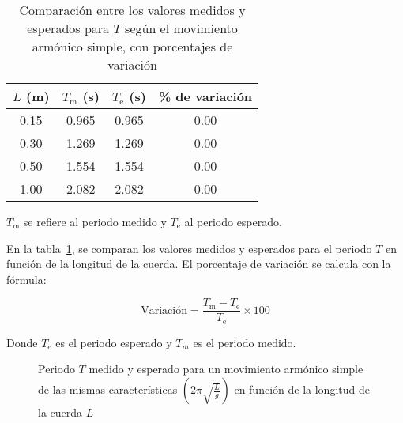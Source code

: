 \documentclass[twocolumn]{article}
\numberwithin{table}{section}
\begin{document}
\begin{table}
  \centering
  \begin{tabular}{cccc}
    \toprule
    $L$ (m) & $T_{\text{m}}$ (s) &
    $T_{\text{e}}$ (s) & \% de variación \\
    \midrule
    0.15 & 0.965 & 0.965 & 0.00 \\
    0.30 & 1.269 & 1.269 & 0.00 \\
    0.50 & 1.554 & 1.554 & 0.00 \\
    1.00 & 2.082 & 2.082 & 0.00 \\
    \bottomrule
  \end{tabular}

  \caption{Comparación entre los valores medidos y esperados para $T$
    según el movimiento armónico simple, con porcentajes de
  variación}\label{tab:comparación_longitud}

  \vspace{0.5em}
  \begin{minipage}{\columnwidth}
    \footnotesize
    $T_{\text{m}}$ se refiere al periodo medido y $T_{\text{e}}$ al
    periodo esperado.
  \end{minipage}
\end{table}

En la tabla~\ref{tab:comparación_longitud}, se comparan los valores medidos
y esperados para el periodo $T$ en función de la longitud de la
cuerda. El porcentaje de variación se calcula con la fórmula:

\begin{equation}
  \text{Variación} = \frac{T_{\text{m}} - T_{\text{e}}}{T_{\text{e}}} \times 100
\end{equation}

Donde $T_{e}$ es el periodo esperado y $T_{m}$ es el periodo medido.

\begin{figure}[ht]
  \centering
  \caption{Periodo $T$ medido y esperado para un movimiento armónico
    simple de las mismas características
    $\left(2\pi\sqrt{\frac{L}{g}}\right)$ en función de la longitud de
  la cuerda $L$}\label{fig:periodo_mas}
\end{figure}
\end{document}
